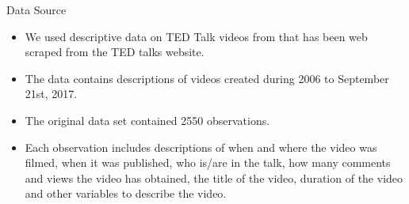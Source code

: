 \begin{frame}{Data Source}
\begin{itemize}
	\item We used descriptive data on TED Talk videos from that has been web scraped from the TED talks website. 
	\item The data contains descriptions of videos created during 2006 to September 21st, 2017. 
	\item The original data set contained 2550 observations. 
	\item Each observation includes descriptions of when and where the video was filmed, when it was published, who is/are in the talk, how many comments and views the video has obtained, the title of the video, duration of the video and other variables to describe the video.
\end{itemize}
\end{frame}
